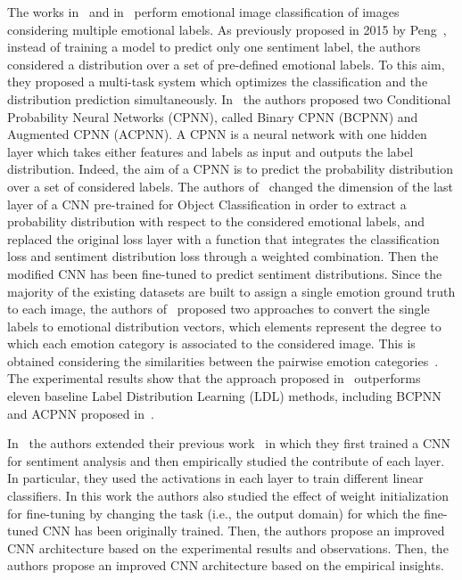 The works in~\cite{yang2017learning} and in~\cite{ijcai2017-456} perform emotional image classification of images considering multiple emotional labels.
As previously proposed in 2015 by Peng~\cite{peng2015mixed}, instead of training a model to predict only one sentiment label, the authors considered a distribution over a set of pre-defined emotional labels. To this aim, they proposed a multi-task system which optimizes the classification and the distribution prediction simultaneously. 
In~\cite{yang2017learning} the authors proposed two Conditional Probability Neural Networks (CPNN), called Binary CPNN (BCPNN) and Augmented CPNN (ACPNN). 
A CPNN is a neural network with one hidden layer which takes either features and labels as input and outputs the label distribution. Indeed, the aim of a CPNN is to predict the probability distribution over a set of considered labels.
The authors of~\cite{ijcai2017-456} changed the dimension of the last layer of a CNN pre-trained for Object Classification in order to extract a probability distribution with respect to the considered emotional labels, and replaced the original loss layer with a function that integrates the classification loss and sentiment
distribution loss through a weighted combination. Then the modified CNN has been fine-tuned to predict sentiment distributions.
Since the majority of the existing datasets are built to assign a single emotion ground truth to each image, the authors of~\cite{ijcai2017-456} proposed two approaches to convert the single labels to emotional distribution vectors, which elements represent the degree to which each emotion category is associated to the considered image.
This is obtained considering the similarities between the pairwise emotion categories~\cite{plutchik1980general}.
The experimental results show that the approach proposed in~\cite{ijcai2017-456} outperforms eleven baseline Label Distribution Learning (LDL) methods, including BCPNN and ACPNN proposed in~\cite{yang2017learning}.

In~\cite{campos2017pixels} the authors extended their previous work~\cite{campos2015diving} in which they first trained a CNN for sentiment analysis and then empirically studied the contribute of each layer. 
In particular, they used the activations in each layer to train different linear classifiers. In this work the authors also studied the effect of weight initialization for fine-tuning by changing the task (i.e., the output domain) for which the fine-tuned CNN has been originally trained.
Then, the authors propose an improved CNN architecture based on the experimental results and observations. 
Then, the authors propose an improved CNN architecture based on the empirical insights. 

